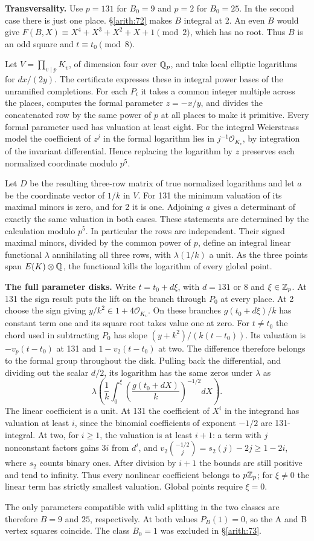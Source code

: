 \textbf{Transversality.} Use \(p=131\) for \(B_0=9\) and \(p=2\) for
\(B_0=25\). In the second case there is just one place. \S\ref{arith:72}
makes \(B\) integral at 2. An even \(B\) would give
\(F(B,X)\equiv X^4+X^3+X^2+X+1\pmod2\), which has no root.
Thus \(B\) is an odd square and \(t\equiv t_0\pmod8\).

Let \(V=\prod_{v\mid p}K_v\), of dimension four over \(\mathbb Q_p\),
and take local elliptic logarithms for \(dx/(2y)\). The certificate
expresses these in integral power bases of the unramified completions.
For each \(P_i\) it takes a common integer multiple across the places,
computes the formal parameter \(z=-x/y\), and divides the concatenated
row by the same power of \(p\) at all places to make it primitive.
Every formal parameter used has valuation at least eight. For the
integral Weierstrass model the coefficient of \(z^j\) in the formal
logarithm lies in \(j^{-1}\mathcal O_{K_v}\), by integration of the
invariant differential. Hence replacing the logarithm by
\(z\) preserves each normalized coordinate modulo \(p^5\).

Let \(D\) be the resulting three-row matrix of true normalized logarithms
and let \(a\) be the coordinate vector of \(1/k\) in \(V\). For 131 the
minimum valuation of its maximal minors is zero, and for 2 it is one.
Adjoining \(a\) gives a determinant of exactly the same valuation in
both cases. These statements are determined by the calculation modulo
\(p^5\). In particular the rows are independent. Their signed maximal
minors, divided by the common power of \(p\), define an integral linear
functional \(\lambda\) annihilating all three rows, with
\(\lambda(1/k)\) a unit. As the three points span \(E(K)\otimes\mathbb Q\),
the functional kills the logarithm of every global point.

\textbf{The full parameter disks.} Write \(t=t_0+d\xi\), with
\(d=131\) or \(8\) and \(\xi\in\mathbb Z_p\). At 131 the sign result
puts the lift on the branch through \(P_0\) at every place. At 2 choose
the sign giving \(y/k^2\in1+4\mathcal O_{K_v}\).
On these branches \(g(t_0+d\xi)/k\) has constant term one and its
square root takes value one at zero. For \(t\ne t_0\) the chord used
in subtracting \(P_0\) has slope \((y+k^2)/(k(t-t_0))\). Its valuation
is \(-v_p(t-t_0)\) at 131 and \(1-v_2(t-t_0)\) at two. The difference
therefore belongs to the formal group throughout the disk. Pulling
back the differential, and dividing out the scalar \(d/2\), its
logarithm has the same zeros under \(\lambda\) as
\[\lambda\!\left(\frac1k\int_0^\xi
     \left(\frac{g(t_0+dX)}{k}\right)^{-1/2}dX\right).\]
The linear coefficient is a unit. At 131 the coefficient of \(X^i\)
in the integrand has valuation at least \(i\), since the binomial
coefficients of exponent \(-1/2\) are 131-integral. At two, for
\(i\ge1\), the valuation is at least \(i+1\): a term with \(j\)
nonconstant factors gains \(3i\) from \(d^i\), and
\(v_2\binom{-1/2}{j}=s_2(j)-2j\ge1-2i\), where \(s_2\) counts
binary ones. After division by \(i+1\) the bounds are still positive
and tend to infinity. Thus every nonlinear coefficient belongs to
\(p\mathbb Z_p\); for \(\xi\ne0\) the linear term has strictly smallest
valuation. Global points require \(\xi=0\).

The only parameters compatible with valid splitting in the two classes
are therefore \(B=9\) and \(25\), respectively. At both values
\(P_B(1)=0\), so the A and B vertex squares coincide. The class
\(B_0=1\) was excluded in \S\ref{arith:73}.
